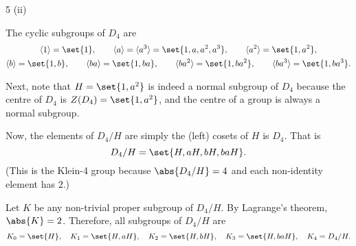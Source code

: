 \documentclass[11pt]{penrose}
\begin{document}
\begin{problem}{5 (ii)}

    The cyclic subgroups of $D_4$ are
    \begin{gather*}
        \cyclic{1} = \set{1}, \qquad
        \cyclic{a} = \cyclic{a^3} = \set{1, a, a^2, a^3}, \qquad
        \cyclic{a^2} = \set{1, a^2},\\
        \cyclic{b} = \set{1, b}, \qquad
        \cyclic{ba} = \set{1, ba}, \qquad
        \cyclic{ba^2} = \set{1, ba^2}, \qquad
        \cyclic{ba^3} = \set{1, ba^3}.
    \end{gather*}

    Next, note that $H = \set{1,a^2}$ is indeed a normal subgroup of $D_4$ because the centre of $D_4$ is $Z(D_4) = \set{1,a^2}$, and the centre of a group is always a normal subgroup.

    Now, the elements of $D_4/H$ are simply the (left) cosets of $H$ is $D_4$. That is
    \begin{equation*}
        D_4/H = \set{H, aH, bH, baH}.
    \end{equation*}
    (This is the Klein-4 group because $\abs{D_4/H} = 4$ and each non-identity element has $2$.)

    Let $K$ be any non-trivial proper subgroup of $D_4/H$. By Lagrange's theorem, $\abs{K} = 2$. Therefore, all subgroups of $D_4/H$ are
    \begin{equation*}
        K_0 = \set{H}, \quad
        K_1 = \set{H, aH}, \quad
        K_2 = \set{H, bH}, \quad
        K_3 = \set{H, baH}, \quad
        K_4 = D_4/H.
    \end{equation*}
\end{problem}
\end{document}
